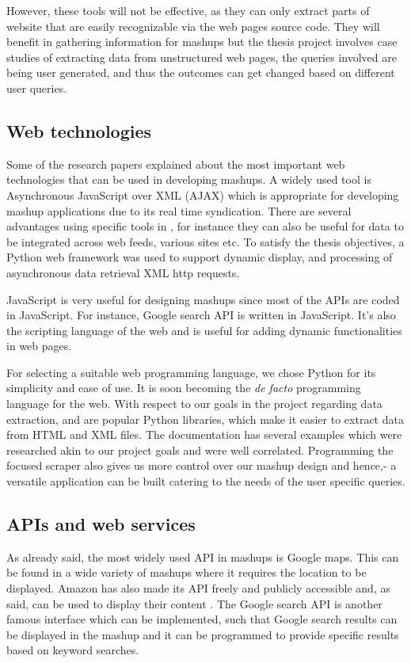 However, these tools will not be effective, as they can only extract parts of website that are easily recognizable via the web pages source code. They will benefit in gathering information for mashups but the thesis project involves case studies of extracting data from unstructured web pages, the queries involved are being user generated, and thus the outcomes can get changed based on different user queries.

\subsection{ Web technologies}
Some of the research papers explained about the most important web technologies that can be used in developing mashups. A widely used tool is Asynchronous JavaScript over XML (AJAX) which is appropriate for developing mashup applications due to its real time syndication. There are several advantages using specific tools in \cite{16}, for instance they can also be useful for data to be integrated across web feeds, various sites etc. To satisfy the thesis objectives, a Python web framework was used to support dynamic display, and processing of asynchronous data retrieval XML http requests.

JavaScript is very useful for designing mashups since most of the APIs are coded in JavaScript. For instance, Google search API is written in JavaScript. It’s also the scripting language of the web and is useful for adding dynamic functionalities in web pages.

For selecting a suitable web programming language, we chose Python for its simplicity and ease of use. It is soon becoming the \textsl{de facto} programming language for the web. With respect to our goals in the project regarding data extraction, \cite{5} and \cite{6} are popular Python libraries, which make it easier to extract data from HTML and XML files. The documentation has several examples which were researched akin to our project goals and were well correlated. Programming the focused scraper also gives us more control over our mashup design and hence,-  a versatile application can be built catering to the needs of the user specific queries.

\subsection{APIs and web services}
As already said, the most widely used API in mashups is Google maps. This can be found in a wide variety of mashups where it requires the location to be displayed. Amazon has also made its API freely and publicly accessible and, as said, can be used to display their content \cite{17}. The Google search API is another famous interface which can be implemented, such that Google search results can be displayed in the mashup and it can be programmed to provide specific results based on keyword searches.

